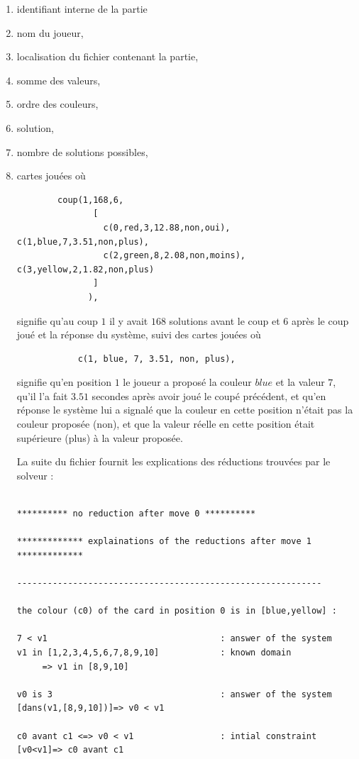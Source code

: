 \documentclass[a4paper,12pt]{article}
\begin{document}
\begin{enumerate}
	\item identifiant interne de la partie
	\item nom du joueur,
	\item localisation du fichier contenant la partie, 
	\item somme des valeurs,
	\item ordre des couleurs,
	\item solution,
	\item nombre de solutions possibles,
	\item cartes jouées où
		\begin{Verbatim}
		coup(1,168,6,
			   [
				 c(0,red,3,12.88,non,oui), c(1,blue,7,3.51,non,plus), 
 				 c(2,green,8,2.08,non,moins), c(3,yellow,2,1.82,non,plus)
 			   ]
  			  ),
		\end{Verbatim}
		signifie qu’au coup $1$ il y avait $168$ solutions avant le coup et $6$ après le coup joué et la réponse du système, suivi des cartes jouées où
		\begin{Verbatim}
			c(1, blue, 7, 3.51, non, plus),
		\end{Verbatim}
		signifie qu’en position $1$ le joueur a proposé la couleur $blue$ et la valeur $7$, qu’il l’a fait $3.51$ secondes après avoir joué le coupé précédent, et qu’en réponse le système lui a signalé que la couleur en cette position n’était pas la couleur proposée (non), et que la valeur réelle en cette position était supérieure (plus) à la valeur proposée.
		
La suite du fichier fournit les explications des réductions trouvées par le solveur :

\begin{Verbatim}

********** no reduction after move 0 **********

************* explainations of the reductions after move 1 *************

------------------------------------------------------------

the colour (c0) of the card in position 0 is in [blue,yellow] : 

7 < v1                                  : answer of the system 
v1 in [1,2,3,4,5,6,7,8,9,10]            : known domain 
     => v1 in [8,9,10]

v0 is 3                                 : answer of the system 
[dans(v1,[8,9,10])]=> v0 < v1

c0 avant c1 <=> v0 < v1                 : intial constraint 
[v0<v1]=> c0 avant c1


\end{Verbatim}
\end{enumerate}
\end{document}
